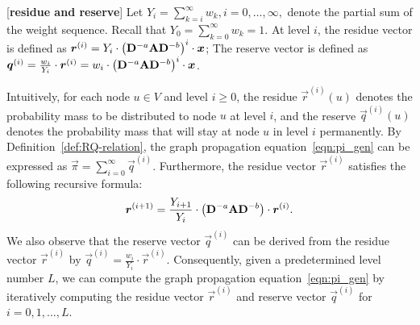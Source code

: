 \begin{definition}\label{def:RQ-relation} [{\bf residue and reserve}]
Let $Y_i=\sum_{k=i}^\infty w_k, i=0,\ldots, \infty,$ denote the partial sum of the weight sequence. Recall that $Y_0 = \sum_{k=0}^\infty w_k = 1$.  At level $i$, the residue vector is defined as $\bm{r}^{(i)}=Y_i\cdot \left(\mathbf{D}^{-a}\mathbf{A}\mathbf{D}^{-b} \right)^i \cdot \bm{x}$;  The reserve vector is defined as $\bm{q}^{(i)}=\frac{w_i}{Y_i}\cdot \bm{r}^{(i)}=w_i \cdot \left(\mathbf{D}^{-a}\mathbf{A}\mathbf{D}^{-b} \right)^i \cdot \bm{x}$. 
\end{definition}


Intuitively, for each node $u\in V$ and level $i \ge 0$, the residue $\vec{r}^{(i)}(u)$ denotes the probability mass to be distributed to node $u$ at level $i$, and the reserve $\vec{q}^{(i)}(u)$ denotes the probability mass that will stay at node $u$ in level $i$ permanently. 
By Definition~\ref{def:RQ-relation}, the graph propagation equation~\eqref{eqn:pi_gen} can be expressed as $\vec{\pi}=\sum_{i=0}^\infty \vec{q}^{(i)}.$
Furthermore, the residue vector $\vec{r}^{(i)}$ satisfies the following recursive formula:
\begin{align}\label{eqn:iteration}
	\bm{r}^{(i+1)}=\frac{Y_{i+1}}{Y_i}\cdot\left(\mathbf{D}^{-a}\mathbf{A} \mathbf{D}^{-b} \right)\cdot \bm{r}^{(i)}. 
\end{align} 
We also observe that the reserve vector  $\vec{q}^{(i)}$ can be derived from the residue vector $\vec{r}^{(i)}$ by $\vec{q}^{(i)}=\frac{w_i}{Y_i}\cdot \vec{r}^{(i)}$.  Consequently, given a predetermined level number $L$, we can compute the graph propagation equation~\eqref{eqn:pi_gen} by iteratively computing the residue vector $\vec{r}^{(i)}$ and reserve vector $\vec{q}^{(i)}$ for $i=0,1,...,L$.

